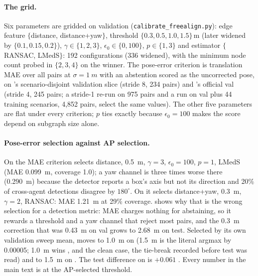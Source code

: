 \paragraph{The grid.}
Six parameters are gridded on validation (\texttt{calibrate\_freealign.py}): edge feature $\{$distance, distance+yaw$\}$, threshold $\{0.3,0.5,1.0,1.5\}$\,m (later widened by $\{0.1,0.15,0.2\}$), $\gamma\in\{1,2,3\}$, $\epsilon_0\in\{0,100\}$, $p\in\{1,3\}$ and estimator $\{$RANSAC, LMedS$\}$: 192 configurations (336 widened), with the minimum node count probed in $\{2,3,4\}$ on the winner. The pose-error criterion is translation MAE over all pairs at $\sigma=\SI{1}{m}$ with an abstention scored as the uncorrected pose, on \opvv's scenario-disjoint validation slice (stride 8, 234 pairs) and \vxreal's official val (stride 4, 245 pairs; a stride-1 re-run on 975 pairs and a run on val plus 44 training scenarios, 4,852 pairs, select the same values). The other five parameters are flat under every criterion; $p$ ties exactly because $\epsilon_0{=}100$ makes the score depend on subgraph size alone.

\paragraph{Pose-error selection against AP selection.}
On \opvv the MAE criterion selects distance, \SI{0.5}{m}, $\gamma{=}3$, $\epsilon_0{=}100$, $p{=}1$, LMedS (MAE \SI{0.099}{m}, coverage 1.0); a yaw channel is three times worse there (\SI{0.290}{m}) because the detector reports a box's axis but not its direction and 20\% of cross-agent detections disagree by $180^\circ$. On \vxreal it selects distance+yaw, \SI{0.3}{m}, $\gamma{=}2$, RANSAC: MAE \SI{1.21}{m} at 29\% coverage.  shows why that is the wrong selection for a detection metric: MAE charges nothing for abstaining, so it rewards a threshold and a yaw channel that reject most pairs, and the \SI{0.3}{m} correction that was \SI{0.43}{m} on val grows to \SI{2.68}{m} on test. Selected by its own validation  sweep mean, \freealign moves to \SI{1.0}{m} on \vxreal (\SI{1.5}{m} is the literal argmax by 0.00005; \SI{1.0}{m} wins ,  and the clean case, the tie-break recorded before test was read) and to \SI{1.5}{m} on \opvv. The test difference on \vxreal is $+0.061$ . Every \freealign number in the main text is at the AP-selected threshold.

